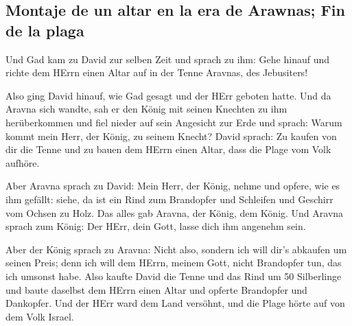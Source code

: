 \hypertarget{montaje-de-un-altar-en-la-era-de-arawnas-fin-de-la-plaga}{%
\subsection{Montaje de un altar en la era de Arawnas; Fin de la
plaga}\label{montaje-de-un-altar-en-la-era-de-arawnas-fin-de-la-plaga}}

 Und Gad kam zu David zur selben Zeit und sprach zu ihm:
Gehe hinauf und richte dem HErrn einen Altar auf in der Tenne Aravnas,
des Jebusiters!

 Also ging David hinauf, wie Gad gesagt und der HErr
geboten hatte.  Und da Aravna sich wandte, sah er den
König mit seinen Knechten zu ihm herüberkommen und fiel nieder auf sein
Angesicht zur Erde  und sprach: Warum kommt mein Herr,
der König, zu seinem Knecht? David sprach: Zu kaufen von dir die Tenne
und zu bauen dem HErrn einen Altar, dass die Plage vom Volk aufhöre.

 Aber Aravna sprach zu David: Mein Herr, der König, nehme
und opfere, wie es ihm gefällt: siehe, da ist ein Rind zum Brandopfer
und Schleifen und Geschirr vom Ochsen zu Holz.  Das alles
gab Aravna, der König, dem König. Und Aravna sprach zum König: Der HErr,
dein Gott, lasse dich ihm angenehm sein.

 Aber der König sprach zu Aravna: Nicht also, sondern ich
will dir's abkaufen um seinen Preis; denn ich will dem HErrn, meinem
Gott, nicht Brandopfer tun, das ich umsonst habe. Also kaufte David die
Tenne und das Rind um 50 Silberlinge  und baute daselbst
dem HErrn einen Altar und opferte Brandopfer und Dankopfer. Und der HErr
ward dem Land versöhnt, und die Plage hörte auf von dem Volk Israel.
